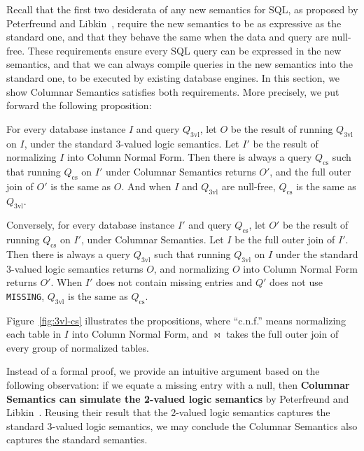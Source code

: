 \documentclass[sigconf]{acmart}
\begin{document}
Recall that the first two desiderata of any new semantics for SQL, 
 as proposed by Peterfreund and Libkin~\cite{DBLP:conf/pods/LibkinP23},
 require the new semantics to be as expressive as the standard one,
 and that they behave the same when the data and query are null-free.
These requirements ensure every SQL query can be expressed in the 
 new semantics, 
 and that we can always compile queries in the new semantics into the standard one,
 to be executed by existing database engines.
In this section, we show Columnar Semantics satisfies both requirements.
More precisely, we put forward the following proposition:
%
\begin{proposition}
\label{prop:cs-eq-3vl}
For every database instance $I$ and query $Q_\text{3vl}$,
 let $O$ be the result of running $Q_\text{3vl}$ on $I$, 
 under the standard 3-valued logic semantics.
Let $I'$ be the result of normalizing $I$ into Column Normal Form.
Then there is always a query $Q_\text{cs}$ such that
 running $Q_\text{cs}$ on $I'$ under Columnar Semantics returns $O'$,
 and the full outer join of $O'$ is the same as $O$.
And when $I$ and $Q_\text{3vl}$ are null-free, $Q_\text{cs}$ 
 is the same as $Q_\text{3vl}$.
\end{proposition}
%
\begin{proposition}
\label{prop:3vl-eq-cs}
Conversely, for every database instance $I'$ and query $Q_\text{cs}$,
 let $O'$ be the result of running $Q_\text{cs}$ on $I'$, 
 under Columnar Semantics.
Let $I$ be the full outer join of $I'$.
Then there is always a query $Q_\text{3vl}$ such that
 running $Q_\text{3vl}$ on $I$ under the standard 3-valued logic semantics returns $O$,
 and normalizing $O$ into Column Normal Form returns $O'$.
When $I'$ does not contain missing entries and $Q'$ does not use \lstinline|MISSING|,
 $Q_\text{3vl}$ is the same as $Q_\text{cs}$.
\end{proposition}
%
Figure~\ref{fig:3vl-cs} illustrates the propositions, 
 where ``c.n.f.'' means normalizing each table in $I$ into Column Normal Form,
 and $\Join$ takes the full outer join of every group of normalized tables.

Instead of a formal proof, 
 we provide an intuitive argument based on the following observation:
 if we equate a missing entry with a null,
 then \textbf{Columnar Semantics can simulate the 2-valued logic semantics} 
 by Peterfreund and Libkin~\cite{DBLP:conf/pods/LibkinP23}.
Reusing their result that the 2-valued logic semantics
 captures the standard 3-valued logic semantics,
 we may conclude the Columnar Semantics also captures the standard semantics.
\end{document}
